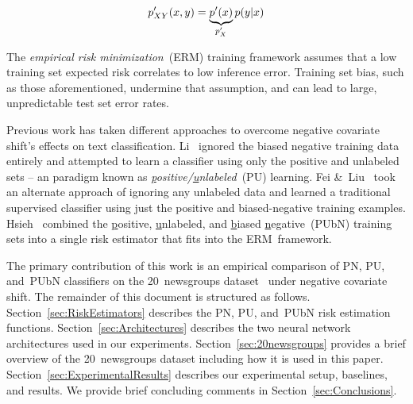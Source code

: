 \documentclass[]{subfiles}
\begin{document}
\begin{equation}\label{eq:TestDist}
  p_{XY}'(x,y) = \underbrace{p'(x)}_{p_{X}'} p(y \vert x)
\end{equation}

The \textit{empirical risk minimization}~(ERM) training framework assumes that a low training set expected risk correlates to low inference error. Training set bias, such as those aforementioned, undermine that assumption, and can lead to large, unpredictable test set error rates.

Previous work has taken different approaches to overcome negative covariate shift's effects on text classification.  Li\etal~\cite{Li:2010} ignored the biased negative training data entirely and attempted to learn a classifier using only the positive and unlabeled sets -- an paradigm known as \textit{\underline{p}ositive\-/\underline{u}nlabeled}~(PU) learning.  Fei \&~Liu~\cite{Fei:2015} took an alternate approach of ignoring any unlabeled data and learned a traditional supervised classifier using just the positive and biased-negative training examples.  Hsieh\etal~\cite{Hsieh:2018} combined the \underline{p}ositive, \underline{u}nlabeled, and \underline{b}iased \underline{n}egative~(PUbN) training sets into a single risk estimator that fits into the ERM~framework.

The primary contribution of this work is an empirical comparison of PN, PU, and~PUbN classifiers on the 20~newsgroups dataset~\cite{20newsgroups} under negative covariate shift.  The remainder of this document is structured as follows.  Section~\ref{sec:RiskEstimators} describes the PN, PU, and~PUbN risk estimation functions. Section~\ref{sec:Architectures} describes the two neural network architectures used in our experiments. Section~\ref{sec:20newsgroups} provides a brief overview of the 20~newsgroups dataset including how it is used in this paper. Section~\ref{sec:ExperimentalResults} describes our experimental setup, baselines, and results.  We provide brief concluding comments in Section~\ref{sec:Conclusions}.
\end{document}
